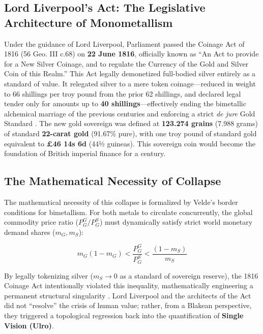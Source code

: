 \documentclass[
]{article}
\begin{document}
\subsection{Lord Liverpool's Act: The Legislative Architecture of
Monometallism}\label{lord-liverpools-act-the-legislative-architecture-of-monometallism}

Under the guidance of Lord Liverpool, Parliament passed the Coinage Act
of 1816 (56 Geo. III c.68) on \textbf{22 June 1816}, officially known as
``An Act to provide for a New Silver Coinage, and to regulate the
Currency of the Gold and Silver Coin of this Realm.'' This Act legally
demonetized full-bodied silver entirely as a standard of value. It
relegated silver to a mere token coinage---reduced in weight to 66
shillings per troy pound from the prior 62 shillings, and declared legal
tender only for amounts up to \textbf{40 shillings}---effectively ending
the bimetallic alchemical marriage of the previous centuries and
enforcing a strict \emph{de jure} Gold Standard
\citep{redish1990evolution}. The new gold sovereign was defined at
\textbf{123.274 grains} (7.988 grams) of standard \textbf{22-carat gold}
(91.67\% pure), with one troy pound of standard gold equivalent to
\textbf{£46 14s 6d} (44½ guineas). This sovereign coin would become the
foundation of British imperial finance for a century.

\subsection{The Mathematical Necessity of
Collapse}\label{the-mathematical-necessity-of-collapse}

The mathematical necessity of this collapse is formalized by Velde's
border conditions for bimetallism. For both metals to circulate
concurrently, the global commodity price ratio (\(P_G^G / P_G^S\)) must
dynamically satisfy strict world monetary demand shares (\(m_G, m_S\)):

\begin{equation}
\label{eq:velde_demand_shares}
m_G (1 - m_G) < \frac{P_G^G}{P_G^S} < \frac{(1 - m_S)}{m_S}
\end{equation}

By legally tokenizing silver (\(m_S \to 0\) as a standard of sovereign
reserve), the 1816 Coinage Act intentionally violated this inequality,
mathematically engineering a permanent structural singularity
\citep{velde2005bimetallism, quinn1996competing}. Lord Liverpool and the
architects of the Act did not ``resolve'' the crisis of human value;
rather, from a Blakean perspective, they triggered a topological
regression back into the quantification of \textbf{Single Vision
(Ulro)}.
\end{document}
